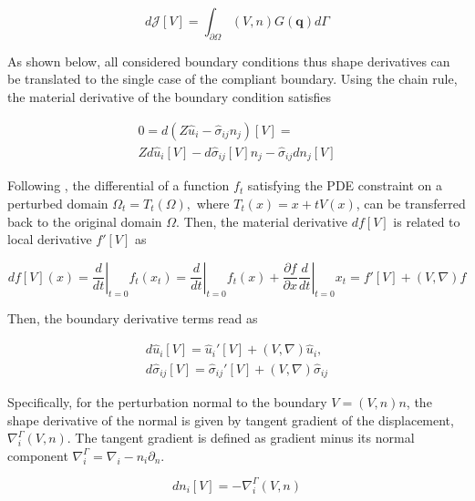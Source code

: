 \begin{equation}
d\mathcal{J}[V] = \int_{\partial \Omega} (V,n) G(\textbf{q}) d\Gamma
\end{equation}

As shown below, all considered boundary conditions thus shape derivatives can be translated to the single case of the compliant boundary. Using the chain rule, the material derivative of the boundary condition satisfies

\begin{subequations}
\begin{align}
0 = d(Z \hat{u}_i - \hat{\sigma}_{ij} n_j)[V] = \\
Z d\hat{u}_i[V] - d\hat{\sigma}_{ij}[V] n_j - \hat{\sigma}_{ij} d n_j[V]
\end{align}
\end{subequations}

Following \cite{Schmidt2010}, the differential of a function $f_t$ satisfying the PDE constraint on a perturbed domain $\Omega_t = T_t(\Omega),$ where $T_t(x) = x + tV(x)$, can be transferred back to the original domain $\Omega$. Then, the material derivative $df[V]$ is related to local derivative $f'[V]$ as

\begin{equation}
df[V](x) = \left. \frac{d}{dt}\right|_{t=0} f_t(x_t) = \left. \frac{d}{dt}\right|_{t=0} f_t(x) + \frac{\partial f}{\partial x}  \left. \frac{d}{dt}\right|_{t=0} x_t = f'[V] + (V,\nabla) f
\end{equation}

Then, the boundary derivative terms read as

\begin{subequations}
\begin{align}
d\hat{u}_i [V] = \hat{u}_i'[V] + (V,\nabla) \hat{u}_i,  \\
d\hat{\sigma}_{ij}[V] = \hat{\sigma}_{ij}'[V] + (V,\nabla) \hat{\sigma}_{ij}
\end{align}
\end{subequations}

Specifically, for the perturbation normal to the boundary $V = (V,n)n$, the shape derivative of the normal is given by tangent gradient of the displacement, $\nabla_i^{\Gamma} (V,n)$. The tangent gradient is defined as gradient minus its normal component $\nabla_i^{\Gamma} = \nabla_i  - n_i \partial_n$. 

\begin{equation}
d n_i[V] = - \nabla_i^{\Gamma} (V,n)
\end{equation}

